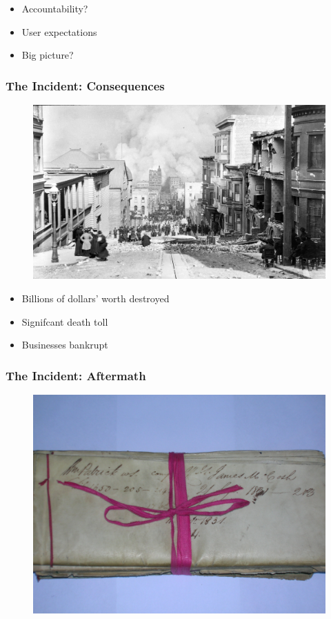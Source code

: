 \begin{itemize}
\item Accountability?
\item User expectations
\item Big picture?
\end{itemize}

\begin{frame}[fragile]
\frametitle{The Incident: Consequences}

\begin{figure}
\includegraphics[scale=0.5]{fire}
\end{figure}

\end{frame}


\begin{itemize}
\item Billions of dollars' worth destroyed
\item Signifcant death toll
\item Businesses bankrupt
\end{itemize}

\begin{frame}[fragile]
\frametitle{The Incident: Aftermath}

\begin{figure}
\includegraphics[scale=0.5]{redtape}
\end{figure}

\end{frame}

